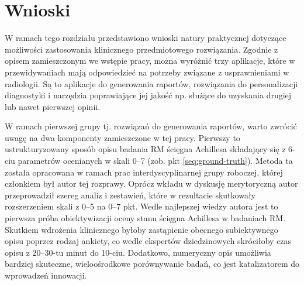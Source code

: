 \chapter{Wnioski}
\label{seq:wnioski}
W ramach tego rozdziału przedstawiono wnioski natury praktycznej dotyczące możliwości zastosowania klinicznego przedmiotowego rozwiązania. Zgodnie z opisem zamieszczonym we wstępie pracy, można wyróżnić trzy aplikacje, które w przewidywaniach mają odpowiedzieć na potrzeby związane z usprawnieniami w radiologii. Są to aplikacje do generowania raportów, rozwiązania do personalizacji diagnostyki i narzędzia poprawiające jej jakość np. służące do uzyskania drugiej lub nawet pierwszej opinii.

W ramach pierwszej grupy tj. rozwiązań do generowania raportów, warto zwrócić uwagę na dwa komponenty zamieszczone w tej pracy. Pierwszy to ustrukturyzowany sposób opisu badania RM ścięgna Achillesa składający się z 6-ciu parametrów ocenianych w skali 0--7 (zob. pkt \ref{seq:ground-truth}). Metoda ta została opracowana w ramach prac interdyscyplinarnej grupy roboczej, której członkiem był autor tej rozprawy. Oprócz wkładu w dyskusję merytoryczną autor przeprowadził szereg analiz i zestawień, które w rezultacie skutkowały rozszerzeniem skali z 0--5 na 0--7 pkt. Wedle najlepszej wiedzy autora jest to pierwsza próba obiektywizacji oceny stanu ścięgna Achillesa w badaniach RM. Skutkiem wdrożenia klinicznego byłoby zastąpienie obecnego subiektywnego opisu poprzez rodzaj ankiety, co wedle ekspertów dziedzinowych skróciłoby czas opisu z 20--30-tu minut do 10-ciu. Dodatkowo, numeryczny opis umożliwia bardziej skuteczne, wieloośrodkowe porównywanie badań, co jest katalizatorem do wprowadzeń innowacji. 

